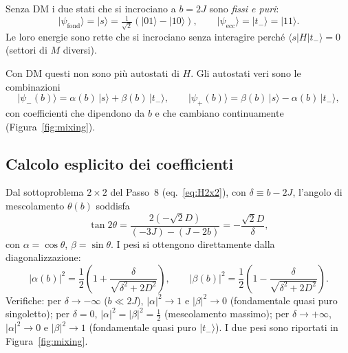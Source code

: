 \documentclass[11pt,a4paper]{article}
\newcommand{\ket}[1]{\lvert #1 \rangle}
\newcommand{\melem}[3]{\langle #1 \vert #2 \vert #3 \rangle}
\theoremstyle{definition}
\begin{document}
Senza DM i due stati che si incrociano a $b=2J$ sono \emph{fissi e puri}:
\[
\ket{\psi_{\mathrm{fond}}}=\ket{s}=\tfrac1{\sqrt2}(\ket{01}-\ket{10}),\qquad
\ket{\psi_{\mathrm{ecc}}}=\ket{t_-}=\ket{11}.
\]
Le loro energie sono rette che si incrociano senza interagire perché
$\melem{s}{H}{t_-}=0$ (settori di $M$ diversi).

Con DM questi non sono più autostati di $H$. Gli autostati veri sono le combinazioni
\begin{equation}
\ket{\psi_-(b)}=\alpha(b)\,\ket{s}+\beta(b)\,\ket{t_-},\qquad
\ket{\psi_+(b)}=\beta(b)\,\ket{s}-\alpha(b)\,\ket{t_-},
\label{eq:autostati_misti}
\end{equation}
con coefficienti che dipendono da $b$ e che cambiano continuamente
(Figura~\ref{fig:mixing}).

\subsection{Calcolo esplicito dei coefficienti}

Dal sottoproblema $2\times2$ del Passo~8 (eq.~\eqref{eq:H2x2}), con $\delta\equiv b-2J$,
l'angolo di mescolamento $\theta(b)$ soddisfa
\begin{equation}
\tan2\theta = \frac{2(-\sqrt2 D)}{(-3J)-(J-2b)} = -\frac{\sqrt2 D}{\delta},
\label{eq:theta}
\end{equation}
con $\alpha=\cos\theta$, $\beta=\sin\theta$. I pesi si ottengono direttamente dalla diagonalizzazione:
\begin{equation}
|\alpha(b)|^2 = \frac12\!\left(1+\frac{\delta}{\sqrt{\delta^2+2D^2}}\right),\qquad
|\beta(b)|^2 = \frac12\!\left(1-\frac{\delta}{\sqrt{\delta^2+2D^2}}\right).
\label{eq:pesi}
\end{equation}
Verifiche: per $\delta\to-\infty$ ($b\ll2J$), $|\alpha|^2\to1$ e $|\beta|^2\to0$
(fondamentale quasi puro singoletto); per $\delta=0$, $|\alpha|^2=|\beta|^2=\tfrac12$
(mescolamento massimo); per $\delta\to+\infty$, $|\alpha|^2\to0$ e $|\beta|^2\to1$
(fondamentale quasi puro $\ket{t_-}$). I due pesi sono riportati in Figura~\ref{fig:mixing}.
\end{document}

